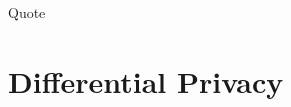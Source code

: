 \documentclass[../../fulltext/fulltext.tex]{subfiles}
\begin{document}
\begin{savequote}[45mm]
	Quote
\end{savequote}

\chapter{Differential Privacy}
\end{document}

